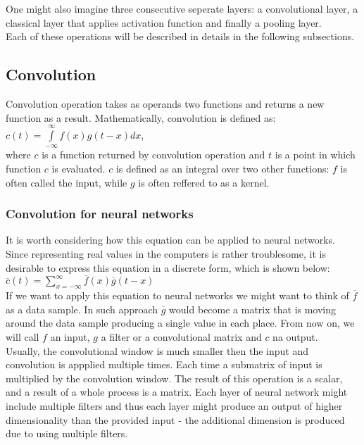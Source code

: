 \documentclass[a4paper,10pt]{report}
\begin{document}
	One might also imagine three consecutive seperate layers: a convolutional layer, a classical layer that applies activation function and finally a pooling layer.\\
	
	Each of these operations will be described in details in the following subsections.\\
	
	\subsection{Convolution}\label{sec:convolution}
	Convolution operation takes as operands two functions and returns a new function as a result. Mathematically, convolution is defined as: \\
	
	$c(t) = \int\limits_{-\infty}^\infty f(x)g(t-x)dx$,\\
	
	where $c$ is a function returned by convolution operation and $t$ is a point in which function $c$ is evaluated. $c$ is defined as an integral over two other functions: $f$ is often called the input, while $g$ is often reffered to as a kernel.\\
	
		
	\subsubsection{Convolution for neural networks}
	  
	  It is worth considering how this equation can be applied to neural networks. Since representing real values in the computers is rather troublesome, it is desirable to express this equation in a discrete form, which is shown below:\\
	  
	  $\overline{c}(t) = \sum\limits_{x = -\infty}^\infty \overline{f}(x)\overline{g}(t-x)$ \\%
	  
	  If we want to apply this equation to neural networks we might want to think of $\overline{f}$ as a data sample. In such approach $\overline{g}$ would become a matrix that is moving around the data sample producing a single value in each place. From now on, we will call $f$ an input, $g$ a filter or a convolutional matrix and $c$ na output.\\
	  
	  Usually, the convolutional window is much smaller then the input and convolution is appplied multiple times. Each time a  submatrix of input is multiplied by the convolution window. The result of this operation is a scalar, and a result of a whole process is a matrix. Each layer of neural network might include multiple filters and thus each layer might produce an output of higher dimensionality than the provided input - the additional dimension is produced due to using multiple filters.\\
	  
\end{document}
